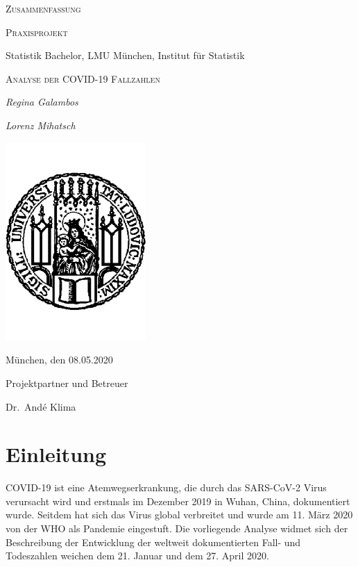 \documentclass[12pt, a4paper]{article}
\begin{document}

\begin{titlepage}
	\centering
	{\scshape\Large Zusammenfassung \par}
	\vspace{0.5cm}
	{\scshape Praxisprojekt \par}
	{Statistik Bachelor, LMU München, Institut für Statistik\par}
	\vspace{1.0cm}
	{\scshape\LARGE Analyse der COVID-19 Fallzahlen
 \par}
 	\vspace{2cm}
	{\Large\itshape Regina Galambos\par}
	{\Large\itshape Lorenz Mihatsch\par}
	\vspace{2cm}

	\includegraphics[width=0.4\textwidth]{LMU.pdf}\\


	\vspace{1cm}
	{München, den 08.05.2020\par}
	\vspace{1cm}
	{Projektpartner und Betreuer\par
	 Dr.\ And\'{e} Klima\par}
\end{titlepage}

\section{Einleitung}
COVID-19 ist eine Atemwegserkrankung, die durch das SARS-CoV-2 Virus verursacht wird und erstmals im Dezember 2019 in Wuhan, China, dokumentiert wurde. Seitdem hat sich das Virus global verbreitet und wurde am 11. März 2020 von der WHO als Pandemie eingestuft. Die vorliegende Analyse widmet sich der Beschreibung der Entwicklung der weltweit dokumentierten Fall- und Todeszahlen weichen dem 21. Januar und dem 27. April 2020.
\end{document}
